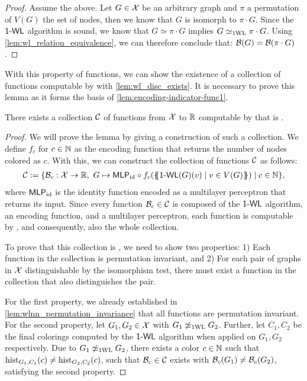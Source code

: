 \begin{proof}
    Assume the above. Let $G \in \mathcal{X}$ be an arbitrary graph and $\pi$ a permutation of $V(G)$ the set of nodes, then we know that $G$ is isomorph to $\pi \cdot G$. Since the $\textsf{1-WL}$ algorithm is sound, we know that $G \simeq \pi \cdot G$ implies $G \simeq_{\text{1WL}} \pi \cdot G$. Using \cref{lem:wl_relation_equivalence}, we can therefore conclude that: $\mathcal{B}(G) = \mathcal{B}(\pi \cdot G)$.
\end{proof}

With this property of \wlnn functions, we can show the existence of a \wldisc collection of functions computable by \wlnn with \cref{lem:wl_disc_exists}. It is necessary to prove this lemma as it forms the basis of \cref{lem:encoding-indicator-func1}.
\begin{lemma}\label{lem:wl_disc_exists}
    There exists a collection $\mathcal{C}$ of functions from $\mathcal{X}$ to $\mathbb{R}$ computable by \wlnn that is \wldisc.
\end{lemma}

\begin{proof}
    We will prove the lemma by giving a construction of such a collection.
    We define $f_c$ for $c \in \mathbb{N}$ as the encoding function that returns the number of nodes colored as $c$. With this, we can construct the collection of functions $\mathcal{C}$ as follows:
    \begin{align*}
        \mathcal{C} := \{ \mathcal{B}_c: \mathcal{X} \rightarrow \mathbb{R}, \ G \mapsto \textsf{MLP}_\text{id} \circ f_c (\{\!\!\{ \textsf{1-WL}(G)(v) \mid v \in V(G) \}\!\!\}) \mid c \in \mathbb{N}\},
    \end{align*}
    where $\textsf{MLP}_\text{id}$ is the identity function encoded as a multilayer perceptron that returns its input. Since every function $\mathcal{B}_c \in \mathcal{C}$ is composed of the $\textsf{1-WL}$ algorithm, an encoding function, and a multilayer perceptron, each function is computable by \wlnn, and consequently, also the whole collection.
    
    To prove that this collection is \wldisc, we need to show two properties: 1) Each function in the collection is permutation invariant, and 2) For each pair of graphs in $\mathcal{X}$ distinguishable by the \wl isomorphism test, there must exist a function in the collection that also distinguishes the pair. 
    
    For the first property, we already established in \cref{lem:wlnn_permutation_invariance} that all \wlnn functions are permutation invariant. For the second property, let $G_1, G_2 \in \mathcal{X}$ with $G_1 \not\simeq_{\text{1WL}} G_2$. Further, let $C_1, C_2$ be the final colorings computed by the $\textsf{1-WL}$ algorithm when applied on $G_1, G_2$ respectively. Due to $G_1 \not\simeq_{\text{1WL}} G_2$, there exists a color $c \in \mathbb{N}$ such that $\operatorname{hist}_{G_1,C_1}(c) \neq \operatorname{hist}_{G_2,C_2}(c)$, such that $\mathcal{B}_c \in \mathcal{C}$ exists with $\mathcal{B}_c(G_1) \neq \mathcal{B}_c(G_2)$, satisfying the second property.
\end{proof}

